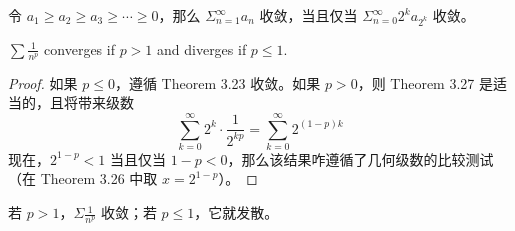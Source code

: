 \documentclass[../poma-notes.tex]{subfiles}
\begin{document}
\begin{anote}
  令 $a_1 \ge a_2 \ge a_3 \ge \cdots \ge 0$，那么 $\Sigma_{n=1}^{\infty} a_n$ 收敛，当且仅当 $\Sigma_{n=0}^{\infty}2^k a_{2^k}$ 收敛。
\end{anote}


\begin{theorem}
  $\sum \frac{1}{n^p}$ converges if $p > 1$ and diverges if $p \le 1$.
\end{theorem}

\begin{proof}
  如果 $p \le 0$，遵循 Theorem 3.23 收敛。如果 $p > 0$，则 Theorem 3.27 是适当的，且将带来级数
  \[ \sum_{k=0}^{\infty} 2^k \cdot \frac{1}{2^{kp}} = \sum_{k=0}^{\infty} 2^{(1-p)k} \]
  现在，$2^{1-p} < 1$ 当且仅当 $1-p < 0$，那么该结果咋遵循了几何级数的比较测试（在 Theorem 3.26 中取 $x = 2^{1-p}$）。
\end{proof}

\anote 若 $p>1$，$\Sigma\frac{1}{n^p}$ 收敛；若 $p\le1$，它就发散。

\end{document}
